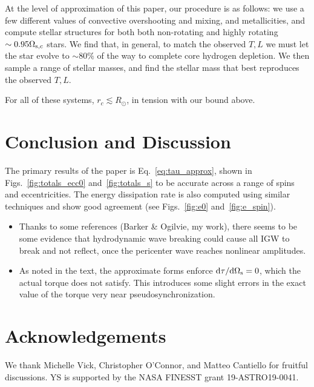 \documentclass[
        fleqn,
        usenatbib,
    ]{mnras}
\newcommand*{\rdil}[2]{\mathrm{d}#1 / \mathrm{d}#2}
\begin{document}
At the level of approximation of this paper, our procedure is as follows: we
use a few different values of convective overshooting and mixing, and
metallicities, and compute stellar structures for both both non-rotating and
highly rotating $\sim 0.95\Omega_{\rm s, c}$ stars. We find that, in general, to
match the observed $T, L$ we must let the star evolve to $\sim 80\%$ of the way
to complete core hydrogen depletion. We then sample a range of stellar masses,
and find the stellar mass that best reproduces the observed $T, L$.

For all of these systems, $r_c \lesssim R_{\odot}$, in tension with our bound
above.

\section{Conclusion and Discussion}\label{s:disc}

The primary results of the paper is Eq.~\eqref{eq:tau_approx}, shown in
Figs.~\ref{fig:totals_ecc0} and~\ref{fig:totals_s} to be accurate across a range
of spins and eccentricities. The energy dissipation rate is also computed using
similar techniques and show good agreement (see Figs.~\ref{fig:e0}
and~\ref{fig:e_spin}).

\begin{itemize}
    \item Thanks to some references (Barker \& Ogilvie, my work), there seems to
        be some evidence that hydrodynamic wave breaking could cause all IGW to
        break and not reflect, once the pericenter wave reaches nonlinear
        amplitudes.

    \item As noted in the text, the approximate forms enforce
        $\rdil{\tau}{\Omega_{\rm s}} = 0$, which the actual torque does not satisfy.
        This introduces some slight errors in the exact value of the torque very
        near pseudosynchronization.
\end{itemize}

\section{Acknowledgements}

We thank Michelle Vick, Christopher O'Connor, and Matteo Cantiello for fruitful
discussions. YS is supported by the NASA FINESST grant 19-ASTRO19-0041.





\bsp
\label{lastpage} %
\end{document}
